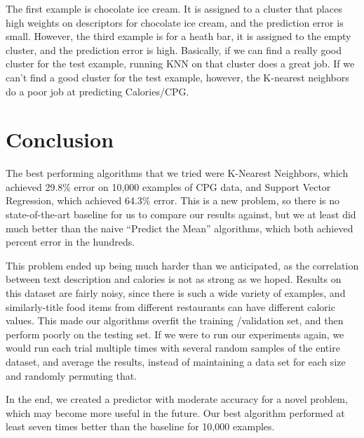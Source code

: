 \documentclass{article}
\begin{document}
The first example is chocolate ice cream. It is assigned to a cluster that places high weights on descriptors for chocolate ice cream, and the prediction error is small. However, the third example is for a heath bar, it is assigned to the empty cluster, and the prediction error is high. Basically, if we can find a really good cluster for the test example, running KNN on that cluster does a great job. If we can’t find a good cluster for the test example, however, the K-nearest neighbors do a poor job at predicting Calories/CPG.

\section{Conclusion}
The best performing algorithms that we tried were K-Nearest Neighbors, which achieved 29.8\% error on 10,000 examples of CPG data, and Support Vector Regression, which achieved 64.3\% error. This is a new problem, so there is no state-of-the-art baseline for us to compare our results against, but we at least did much better than the naive “Predict the Mean” algorithms, which both achieved percent error in the hundreds.

This problem ended up being much harder than we anticipated, as the correlation between text description and calories is not as strong as we hoped. Results on this dataset are fairly noisy, since there is such a wide variety of examples, and similarly-title food items from different restaurants can have different caloric values. This made our algorithms overfit the training /validation set, and then perform poorly on the testing set. If we were to run our experiments again, we would run each trial multiple times with several random samples of the entire dataset, and average the results, instead of maintaining a data set for each size and randomly permuting that.

In the end, we created a predictor with moderate accuracy for a novel problem, which may become more useful in the future. Our best algorithm performed at least seven times better than the baseline for 10,000 examples.
\end{document}
